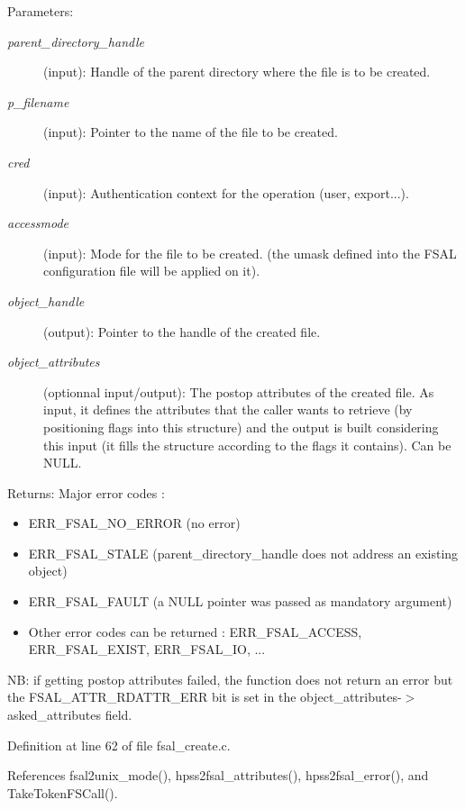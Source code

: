 \begin{Desc}
\item[Parameters:]
\begin{description}
\item[{\em parent\_\-directory\_\-handle}](input): Handle of the parent directory where the file is to be created. \item[{\em p\_\-filename}](input): Pointer to the name of the file to be created. \item[{\em cred}](input): Authentication context for the operation (user, export...). \item[{\em accessmode}](input): Mode for the file to be created. (the umask defined into the FSAL configuration file will be applied on it). \item[{\em object\_\-handle}](output): Pointer to the handle of the created file. \item[{\em object\_\-attributes}](optionnal input/output): The postop attributes of the created file. As input, it defines the attributes that the caller wants to retrieve (by positioning flags into this structure) and the output is built considering this input (it fills the structure according to the flags it contains). Can be NULL.\end{description}
\end{Desc}
\begin{Desc}
\item[Returns:]Major error codes :\begin{itemize}
\item ERR\_\-FSAL\_\-NO\_\-ERROR (no error)\item ERR\_\-FSAL\_\-STALE (parent\_\-directory\_\-handle does not address an existing object)\item ERR\_\-FSAL\_\-FAULT (a NULL pointer was passed as mandatory argument)\item Other error codes can be returned : ERR\_\-FSAL\_\-ACCESS, ERR\_\-FSAL\_\-EXIST, ERR\_\-FSAL\_\-IO, ...\end{itemize}
\end{Desc}
NB: if getting postop attributes failed, the function does not return an error but the FSAL\_\-ATTR\_\-RDATTR\_\-ERR bit is set in the object\_\-attributes-$>$asked\_\-attributes field. 

Definition at line 62 of file fsal\_\-create.c.

References fsal2unix\_\-mode(), hpss2fsal\_\-attributes(), hpss2fsal\_\-error(), and Take\-Token\-FSCall().

